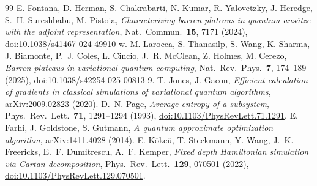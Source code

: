 \documentclass[11pt]{article}
\begin{document}
\begin{thebibliography}{99}
 E. Fontana, D. Herman, S. Chakrabarti, N. Kumar, R. Yalovetzky, J. Heredge, S.~H. Sureshbabu, M. Pistoia, \emph{Characterizing barren plateaus in quantum ans\"atze with the adjoint representation}, Nat.\ Commun.\ \textbf{15}, 7171 (2024), \href{https://doi.org/10.1038/s41467-024-49910-w}{doi:10.1038/s41467-024-49910-w}.
 M. Larocca, S. Thanasilp, S. Wang, K. Sharma, J. Biamonte, P.~J. Coles, L. Cincio, J.~R. McClean, Z. Holmes, M. Cerezo, \emph{Barren plateaus in variational quantum computing}, Nat.\ Rev.\ Phys.\ \textbf{7}, 174--189 (2025), \href{https://doi.org/10.1038/s42254-025-00813-9}{doi:10.1038/s42254-025-00813-9}.
 T. Jones, J. Gacon, \emph{Efficient calculation of gradients in classical simulations of variational quantum algorithms}, \href{https://arxiv.org/abs/2009.02823}{arXiv:2009.02823} (2020).
 D.~N. Page, \emph{Average entropy of a subsystem}, Phys.\ Rev.\ Lett.\ \textbf{71}, 1291--1294 (1993), \href{https://doi.org/10.1103/PhysRevLett.71.1291}{doi:10.1103/PhysRevLett.71.1291}.
 E. Farhi, J. Goldstone, S. Gutmann, \emph{A quantum approximate optimization algorithm}, \href{https://arxiv.org/abs/1411.4028}{arXiv:1411.4028} (2014).
 E. K\"okc\"u, T. Steckmann, Y. Wang, J.~K. Freericks, E.~F. Dumitrescu, A.~F. Kemper, \emph{Fixed depth Hamiltonian simulation via Cartan decomposition}, Phys.\ Rev.\ Lett.\ \textbf{129}, 070501 (2022), \href{https://doi.org/10.1103/PhysRevLett.129.070501}{doi:10.1103/PhysRevLett.129.070501}.
\end{thebibliography}
\end{document}
